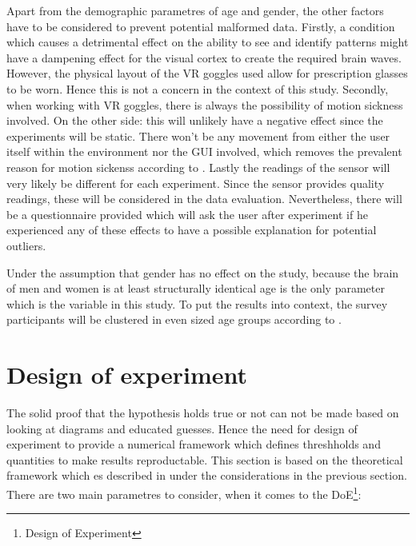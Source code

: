             Apart from the demographic parametres of age and gender, the other factors have to be considered to prevent potential malformed data. Firstly, a condition which causes a detrimental effect on the ability to see and identify patterns might have a dampening effect for the visual cortex to create the required brain waves. However, the physical layout of the VR goggles used allow for prescription glasses to be worn. Hence this is not a concern in the context of this study. Secondly, when working with VR goggles, there is always the possibility of motion sickness involved. On the other side: this will unlikely have a negative effect since the experiments will be static. There won't be any movement from either the user itself within the environment nor the GUI involved, which removes the prevalent reason for motion sickenss according to \cite{Golding.2006}.
            Lastly the readings of the sensor will very likely be different for each experiment. Since the sensor provides quality readings, these will be considered in the data evaluation. Nevertheless, there will be a questionnaire provided which will ask the user after experiment if he experienced any of these effects to have a possible explanation for potential outliers.

            \medskip

            Under the assumption that gender has no effect on the study, because the brain of men and women is at least structurally identical  age is the only parameter which is the variable in this study. To put the results into context, the survey participants will be clustered in even sized age groups according to .

        \section{Design of experiment}\label{doe}

            The solid proof that the hypothesis holds true or not can not be made based on looking at diagrams and educated guesses. Hence the need for design of experiment to provide a numerical framework which defines threshholds and quantities to make results reproductable. This section is based on the theoretical framework which es described in \cite[87ff]{Siebertz.2017} under the considerations in the previous section.
            There are two main parametres to consider, when it comes to the DoE\footnote{Design of Experiment}: 
            
